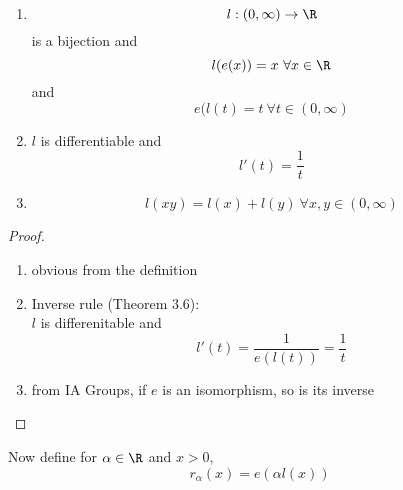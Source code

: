 \begin{theorem}
\hfill{ }
\begin{enumerate}
    \item \[l:(0,\infty)\to \R\] is a bijection and
    \[l(e(x)) = x \ \forall x\in \R\]
    and
    \[e(l(t) = t \ \forall t\in (0,\infty)\]
    \item $l$ is differentiable and
    \[l'(t) = \frac{1}{t}\]
    \item \[l(xy) = l(x) + l(y) \ \forall x,y\in (0,\infty)\]
\end{enumerate}
\begin{proof}
\hfill{ }
\begin{enumerate}
    \item obvious from the definition
    \item Inverse rule (Theorem 3.6):\\
    $l$ is differenitable and
    \[l'(t) = \frac{1}{e(l(t))} = \frac{1}{t}\]
    \item from IA Groups, if $e$ is an isomorphism, so is its inverse
\end{enumerate}
\end{proof}
\end{theorem}
\begin{normal}
Now define for $\alpha\in \R$ and $x>0$,
\[r_{\alpha}(x) = e(\alpha l(x))\]
\end{normal}

